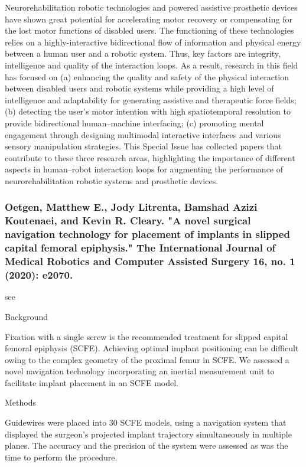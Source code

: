 \documentclass[conference]{IEEEtran}
\begin{document}
Neurorehabilitation robotic technologies and powered assistive prosthetic devices have shown great potential for accelerating motor recovery or compensating for the lost motor functions of disabled users. The functioning of these technologies relies on a highly-interactive bidirectional flow of information and physical energy between a human user and a robotic system. Thus, key factors are integrity, intelligence and quality of the interaction loops. As a result, research in this field has focused on (a) enhancing the quality and safety of the physical interaction between disabled users and robotic systems while providing a high level of intelligence and adaptability for generating assistive and therapeutic force fields; (b) detecting the user’s motor intention with high spatiotemporal resolution to provide bidirectional human–machine interfacing; (c) promoting mental engagement through designing multimodal interactive interfaces and various sensory manipulation strategies. This Special Issue has collected papers that contribute to these three research areas, highlighting the importance of different aspects in human–robot interaction loops for augmenting the performance of neurorehabilitation robotic systems and prosthetic devices.

\medskip
\subsubsection{Oetgen, Matthew E., Jody Litrenta, Bamshad Azizi Koutenaei, and Kevin R. Cleary. "A novel surgical navigation technology for placement of implants in slipped capital femoral epiphysis." The International Journal of Medical Robotics and Computer Assisted Surgery 16, no. 1 (2020): e2070.}
see \cite{oetgen2020novel}

Background

Fixation with a single screw is the recommended treatment for slipped capital femoral epiphysis (SCFE). Achieving optimal implant positioning can be difficult owing to the complex geometry of the proximal femur in SCFE. We assessed a novel navigation technology incorporating an inertial measurement unit to facilitate implant placement in an SCFE model.

Methods

Guidewires were placed into 30 SCFE models, using a navigation system that displayed the surgeon's projected implant trajectory simultaneously in multiple planes. The accuracy and the precision of the system were assessed as was the time to perform the procedure.
\end{document}
